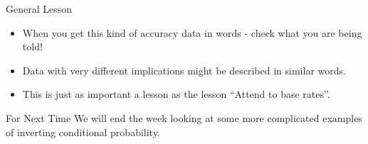 \documentclass[
  ignorenonframetext,
]{beamer}
\providecommand{\tightlist}{%
  \setlength{\itemsep}{0pt}\setlength{\parskip}{0pt}}
\renewcommand{\,}{\text{, }}
\begin{document}
\begin{frame}{General Lesson}
\protect\hypertarget{general-lesson}{}
\begin{itemize}
\tightlist
\item
  When you get this kind of accuracy data in words - check what you are
  being told!
\item
  Data with very different implications might be described in similar
  words.
\item
  This is just as important a lesson as the lesson ``Attend to base
  rates''.
\end{itemize}
\end{frame}

\begin{frame}{For Next Time}
\protect\hypertarget{for-next-time}{}
We will end the week looking at some more complicated examples of
inverting conditional probability.
\end{frame}
\end{document}
